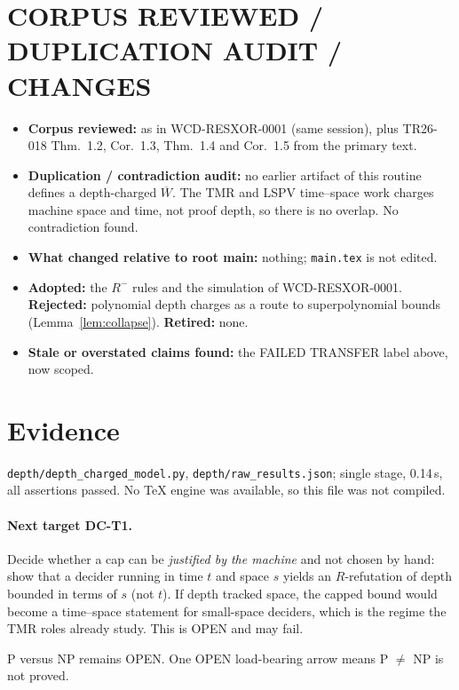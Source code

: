 \documentclass[11pt]{article}
\begin{document}
\section{CORPUS REVIEWED / DUPLICATION AUDIT / CHANGES}
\begin{itemize}
\item \textbf{Corpus reviewed:} as in WCD-RESXOR-0001 (same session), plus TR26-018 Thm.~1.2, Cor.~1.3, Thm.~1.4 and Cor.~1.5 from the primary text.
\item \textbf{Duplication / contradiction audit:} no earlier artifact of this routine defines a depth-charged $\overline W$. The TMR and LSPV time--space work charges machine space and time, not proof depth, so there is no overlap. No contradiction found.
\item \textbf{What changed relative to root main:} nothing; \texttt{main.tex} is not edited.
\item \textbf{Adopted:} the $R^-$ rules and the simulation of WCD-RESXOR-0001. \textbf{Rejected:} polynomial depth charges as a route to superpolynomial bounds (Lemma~\ref{lem:collapse}). \textbf{Retired:} none.
\item \textbf{Stale or overstated claims found:} the FAILED TRANSFER label above, now scoped.
\end{itemize}

\section{Evidence}
\texttt{depth/depth\_charged\_model.py}, \texttt{depth/raw\_results.json}; single stage, 0.14\,s, all assertions passed. No TeX engine was available, so this file was not compiled.

\paragraph{Next target DC-T1.} Decide whether a cap can be \emph{justified by the machine} and not chosen by hand: show that a decider running in time $t$ and space $s$ yields an $R$-refutation of depth bounded in terms of $s$ (not $t$). If depth tracked space, the capped bound would become a time--space statement for small-space deciders, which is the regime the TMR roles already study. This is OPEN and may fail.

\medskip\noindent P versus NP remains OPEN. One OPEN load-bearing arrow means P $\ne$ NP is not proved.
\end{document}
